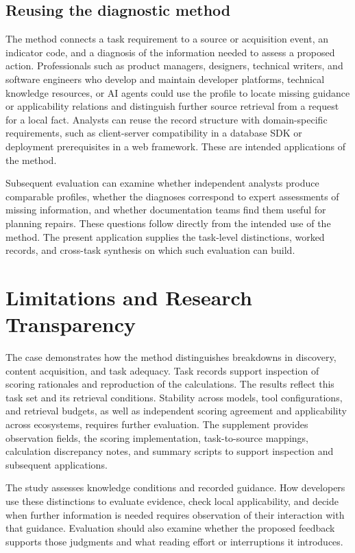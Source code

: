 \documentclass[manuscript,review,anonymous]{acmart}
\begin{document}
\subsection{Reusing the diagnostic method}\label{reusing-the-diagnostic-method}

The method connects a task requirement to a source or acquisition event, an indicator code, and a diagnosis of the information needed to assess a proposed action. Professionals such as product managers, designers, technical writers, and software engineers who develop and maintain developer platforms, technical knowledge resources, or AI agents could use the profile to locate missing guidance or applicability relations and distinguish further source retrieval from a request for a local fact. Analysts can reuse the record structure with domain-specific requirements, such as client-server compatibility in a database SDK or deployment prerequisites in a web framework. These are intended applications of the method.

Subsequent evaluation can examine whether independent analysts produce comparable profiles, whether the diagnoses correspond to expert assessments of missing information, and whether documentation teams find them useful for planning repairs. These questions follow directly from the intended use of the method. The present application supplies the task-level distinctions, worked records, and cross-task synthesis on which such evaluation can build.

\section{Limitations and Research Transparency}\label{limitations-and-research-transparency}

The case demonstrates how the method distinguishes breakdowns in discovery, content acquisition, and task adequacy. Task records support inspection of scoring rationales and reproduction of the calculations. The results reflect this task set and its retrieval conditions. Stability across models, tool configurations, and retrieval budgets, as well as independent scoring agreement and applicability across ecosystems, requires further evaluation. The supplement provides observation fields, the scoring implementation, task-to-source mappings, calculation discrepancy notes, and summary scripts to support inspection and subsequent applications.

The study assesses knowledge conditions and recorded guidance. How developers use these distinctions to evaluate evidence, check local applicability, and decide when further information is needed requires observation of their interaction with that guidance. Evaluation should also examine whether the proposed feedback supports those judgments and what reading effort or interruptions it introduces.
\end{document}
